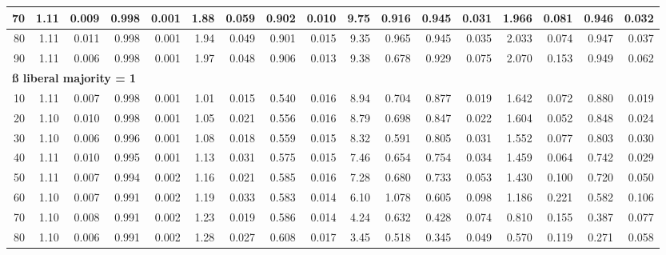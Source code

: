 \documentclass[
]{article}
\begin{document}
\begin{table}[H]
{\begin{tabular}{r|r|r|r|r|r|r|r|r|r|r|r|r|r|r|r|r}
\hline
\hspace{1em}70 & 1.11 & 0.009 & 0.998 & 0.001 & 1.88 & 0.059 & 0.902 & 0.010 & 9.75 & 0.916 & 0.945 & 0.031 & 1.966 & 0.081 & 0.946 & 0.032\\
\hline
\hspace{1em}80 & 1.11 & 0.011 & 0.998 & 0.001 & 1.94 & 0.049 & 0.901 & 0.015 & 9.35 & 0.965 & 0.945 & 0.035 & 2.033 & 0.074 & 0.947 & 0.037\\
\hline
\hspace{1em}90 & 1.11 & 0.006 & 0.998 & 0.001 & 1.97 & 0.048 & 0.906 & 0.013 & 9.38 & 0.678 & 0.929 & 0.075 & 2.070 & 0.153 & 0.949 & 0.062\\
\hline
\multicolumn{17}{l}{\textbf{ß liberal majority = 1}}\\
\hline
\hspace{1em}10 & 1.11 & 0.007 & 0.998 & 0.001 & 1.01 & 0.015 & 0.540 & 0.016 & 8.94 & 0.704 & 0.877 & 0.019 & 1.642 & 0.072 & 0.880 & 0.019\\
\hline
\hspace{1em}20 & 1.10 & 0.010 & 0.998 & 0.001 & 1.05 & 0.021 & 0.556 & 0.016 & 8.79 & 0.698 & 0.847 & 0.022 & 1.604 & 0.052 & 0.848 & 0.024\\
\hline
\hspace{1em}30 & 1.10 & 0.006 & 0.996 & 0.001 & 1.08 & 0.018 & 0.559 & 0.015 & 8.32 & 0.591 & 0.805 & 0.031 & 1.552 & 0.077 & 0.803 & 0.030\\
\hline
\hspace{1em}40 & 1.11 & 0.010 & 0.995 & 0.001 & 1.13 & 0.031 & 0.575 & 0.015 & 7.46 & 0.654 & 0.754 & 0.034 & 1.459 & 0.064 & 0.742 & 0.029\\
\hline
\hspace{1em}50 & 1.11 & 0.007 & 0.994 & 0.002 & 1.16 & 0.021 & 0.585 & 0.016 & 7.28 & 0.680 & 0.733 & 0.053 & 1.430 & 0.100 & 0.720 & 0.050\\
\hline
\hspace{1em}60 & 1.10 & 0.007 & 0.991 & 0.002 & 1.19 & 0.033 & 0.583 & 0.014 & 6.10 & 1.078 & 0.605 & 0.098 & 1.186 & 0.221 & 0.582 & 0.106\\
\hline
\hspace{1em}70 & 1.10 & 0.008 & 0.991 & 0.002 & 1.23 & 0.019 & 0.586 & 0.014 & 4.24 & 0.632 & 0.428 & 0.074 & 0.810 & 0.155 & 0.387 & 0.077\\
\hline
\hspace{1em}80 & 1.10 & 0.006 & 0.991 & 0.002 & 1.28 & 0.027 & 0.608 & 0.017 & 3.45 & 0.518 & 0.345 & 0.049 & 0.570 & 0.119 & 0.271 & 0.058\\

\end{tabular}}
\end{table}
\end{document}
